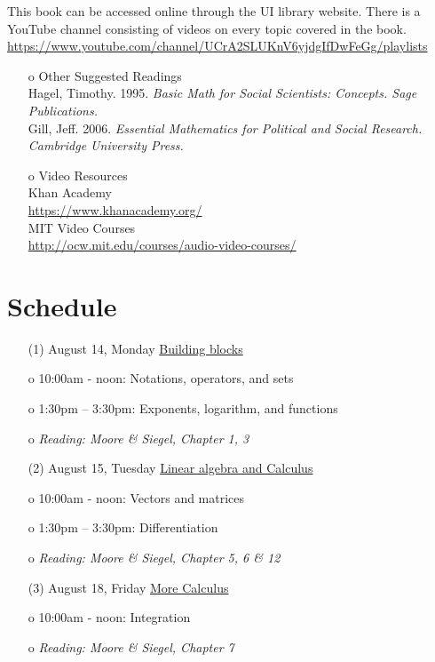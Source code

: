 \documentclass[11pt, a4paper]{article}
\begin{document}
This book can be accessed online through the UI library website. There is a YouTube channel consisting of videos on every topic covered in the book.\\
\href{https://www.youtube.com/channel/UCrA2SLUKnV6yjdgIfDwFeGg/playlists}{https://www.youtube.com/channel/UCrA2SLUKnV6yjdgIfDwFeGg/playlists} 

\begin{itemize}
\item[o] Other Suggested Readings \\
Hagel, Timothy. 1995. {\it Basic Math for Social Scientists: Concepts. Sage Publications.} \\
Gill, Jeff. 2006. {\it Essential Mathematics for Political and Social Research. Cambridge University Press.} 

\item[o] Video Resources \\
Khan Academy \\
\href{https://www.khanacademy.org/}{https://www.khanacademy.org/} \\
MIT Video Courses \\
\href{http://ocw.mit.edu/courses/audio-video-courses/}{http://ocw.mit.edu/courses/audio-video-courses/}
\end{itemize}

\section{Schedule} 
\begin{itemize}
\item[(1)]August 14, Monday \underline{Building blocks} 
\item[o] 10:00am - noon: Notations, operators, and sets
\item[o] 1:30pm – 3:30pm: Exponents, logarithm, and functions
\item[o] {\it Reading: Moore \& Siegel, Chapter 1, 3} 
\end{itemize}

\begin{itemize}
\item[(2)]August 15, Tuesday \underline{Linear algebra and Calculus}
\item[o] 10:00am - noon: Vectors and matrices
\item[o] 1:30pm – 3:30pm: Differentiation
\item[o] {\it Reading: Moore \& Siegel, Chapter 5, 6 \& 12} 
\end{itemize}

\begin{itemize} 
\item[(3)]August 18, Friday \underline{More Calculus} 
\item[o] 10:00am - noon: Integration
\item[o] {\it Reading: Moore \& Siegel, Chapter 7} 
\end{itemize}

\end{document}
